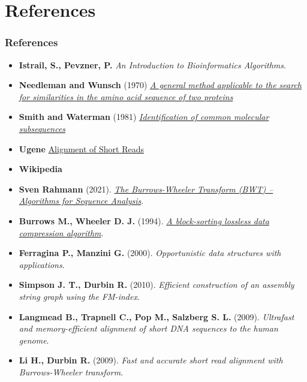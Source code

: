 \documentclass[
11pt, %
aspectratio=169, %
]{beamer}
\begin{document}
\section{References}

\begin{frame}
	\frametitle{References}
	\footnotesize
	\begin{itemize}
		
		\item \textbf{Istrail, S., Pevzner, P.} \textit{An Introduction to Bioinformatics Algorithms}.
		
		\item \textbf{Needleman and Wunsch} (1970) \href {https://pubmed.ncbi.nlm.nih.gov/5420325/}{\textit{A general method applicable to the search for similarities in the amino acid sequence of two proteins}}
		
		\item \textbf{Smith and Waterman} (1981) \href{https://pubmed.ncbi.nlm.nih.gov/7265238/}{\textit{Identification of common molecular subsequences}}
		
		\item \textbf{Ugene} \href{https://ugene.net/alignment-of-short-reads/}{Alignment of Short Reads} 
		
		\item \textbf{Wikipedia}
		
		\item \textbf{Sven Rahmann} (2021).  
		\href{https://www.rahmannlab.de/lehre/alsa21/02-5-bwt.pdf}{\textit{The Burrows-Wheeler Transform (BWT) – Algorithms for Sequence Analysis}}.
		
		\item \textbf{Burrows M., Wheeler D. J.} (1994).  
		\href{https://www.cs.jhu.edu/~langmea/resources/burrows_wheeler.pdf}{\textit{A block-sorting lossless data compression algorithm}}.  
		
		\item \textbf{Ferragina P., Manzini G.} (2000).  
		\textit{Opportunistic data structures with applications}.  
		
		\item \textbf{Simpson J. T., Durbin R.} (2010).  
		\textit{Efficient construction of an assembly string graph using the FM-index}.
		
		\item \textbf{Langmead B., Trapnell C., Pop M., Salzberg S. L.} (2009).  
		\textit{Ultrafast and memory-efficient alignment of short DNA sequences to the human 	genome}.  
		
		\item \textbf{Li H., Durbin R.} (2009).  
		\textit{Fast and accurate short read alignment with Burrows-Wheeler transform}. 
		
	\end{itemize}
	
\end{frame}
\end{document}
